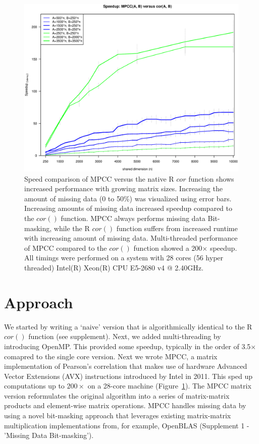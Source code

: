 \documentclass{bioinfo}
\begin{document}
\begin{figure}[H]
\centering
\includegraphics[width=\linewidth]{img/figure02new.eps}
  \caption{
  \small
    Speed comparison of MPCC versus the native R $cor$ function
    shows increased performance with growing matrix sizes. Increasing
    the amount of missing data (0 to 50\%) was visualized using error bars. 
    Increasing amounts of missing data increased speedup compared
    to the $cor()$ function. MPCC always performs missing data Bit-masking,
    while the R $cor()$ function suffers from increased runtime with
    increasing amount of missing data. Multi-threaded performance
    of MPCC compared to the $cor()$ function showed a 200$\times$ speedup.
    All timings were performed on a system with 28 cores (56 hyper
    threaded) Intel(R) Xeon(R) CPU E5-2680 v4 @ 2.40GHz.
}
  \label{fig:fig2}
\end{figure}

\vspace*{-10mm}

\section{Approach}

We started by writing a `naive' version that is algorithmically
identical to the R $cor()$ function (see supplement). Next, we added
multi-threading by introducing OpenMP. This provided some speedup,
typically in the order of 3.5$\times$ comapred to the single core version.  Next we
wrote MPCC, a matrix implementation of Pearson's correlation that
makes use of hardware Advanced Vector Extensions (AVX) instructions
introduced by Intel in 2011. This sped up computations up to
$200\times$ on a 28-core machine (Figure~\ref{fig:fig2}).  The MPCC
matrix version reformulates the original algorithm into a series of
matrix-matrix products and element-wise matrix operations. MPCC
handles missing data by using a novel bit-masking approach that
leverages existing matrix-matrix multiplication implementations
from, for example, OpenBLAS (Supplement 1 - 'Missing Data
Bit-masking').
\end{document}
